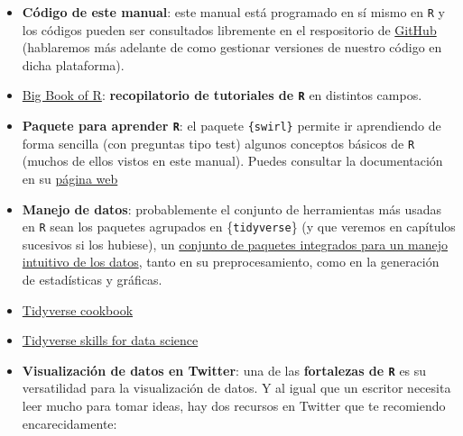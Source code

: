 \documentclass[11pt,]{book}
\begin{document}
\begin{itemize}
\item
  \textbf{Código de este manual}: este manual está programado en sí mismo en \texttt{R} y los códigos pueden ser consultados libremente en el respositorio de \href{https://github.com/dadosdelaplace/docencia}{GitHub} (hablaremos más adelante de como gestionar versiones de nuestro código en dicha plataforma).
\item
  \href{https://www.bigbookofr.com/index.html}{Big Book of R}: \textbf{recopilatorio de tutoriales de \texttt{R}} en distintos campos.
\item
  \textbf{Paquete para aprender \texttt{R}}: el paquete \texttt{\{swirl\}} permite ir aprendiendo de forma sencilla (con preguntas tipo test) algunos conceptos básicos de \texttt{R} (muchos de ellos vistos en este manual). Puedes consultar la documentación en su \href{https://swirlstats.com/}{página web}
\item
  \textbf{Manejo de datos}: probablemente el conjunto de herramientas más usadas en \texttt{R} sean los paquetes agrupados en \{\texttt{tidyverse}\} (y que veremos en capítulos sucesivos si los hubiese), un \href{https://www.tidyverse.org/}{conjunto de paquetes integrados para un manejo intuitivo de los datos}, tanto en su preprocesamiento, como en la generación de estadísticas y gráficas.
\item
  \href{https://rstudio-education.github.io/tidyverse-cookbook/}{Tidyverse cookbook}
\item
  \href{https://jhudatascience.org/tidyversecourse/}{Tidyverse skills for data science}
\item
  \textbf{Visualización de datos en Twitter}: una de las \textbf{fortalezas de \texttt{R}} es su versatilidad para la visualización de datos. Y al igual que un escritor necesita leer mucho para tomar ideas, hay dos recursos en Twitter que te recomiendo encarecidamente:


\end{itemize}
\end{document}
